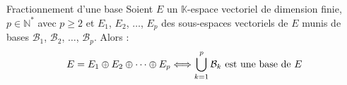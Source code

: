 \documentclass[french,11pt,twoside]{VcCours}
\begin{document}
\medskip


\begin{Proposition}{Fractionnement d'une base}\label{UnionBase} Soient $E$ un $\mathbb{K}$-espace vectoriel de dimension finie, $p \in \mathbb{N}^*$ avec $p \geq 2$ et $E_1$, $E_2$, $\ldots$, $E_p$ des sous-espaces vectoriels de $E$ munis de bases $\mathcal{B}_1$, $\mathcal{B}_2$, $\ldots$, $\mathcal{B}_p$. Alors :
$$ E= E_1 \oplus E_2 \oplus \cdots \oplus E_p \Longleftrightarrow  \bigcup_{k=1}^p \mathcal{B}_k \hbox{ est une base de } E$$
\end{Proposition}
\end{document}
